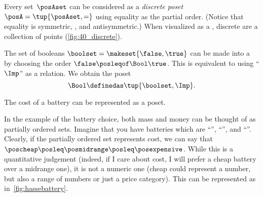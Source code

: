 \clearpage
\begin{marginfigure}
    \centering
    \caption{}
    \label{fig:40_discrete}
\end{marginfigure}

\begin{example}

    \label{ex:discreteposet}
    Every set~$\posAset$ can be considered as a \emph{discrete poset}~$\posA = \tup{\posAset,{{=}}}$ using equality as the partial order.
    (Notice that equality is symmetric, , and antisymmetric.)
    When visualized as a , discrete  are a collection of points (\cref{fig:40_discrete}).
\end{example}
\vspace{1cm}
\begin{marginfigure}[4mm]
    \centering
    \caption{}
\end{marginfigure}

\begin{definition}
    \label{def:bool-poset}
    The set of booleans $\boolset = \makeset{\false, \true}$ can be made into a  by choosing the order $\false \posleqof\Bool \true$.
    This is equivalent to using ``$\Imp$'' as a relation.
    We obtain the poset
    \begin{equation}
        \label{eq:bool-poset}
        \Bool \definedas \tup{\boolset, {{\Imp}}}.
    \end{equation}
\end{definition}

\vspace{1cm}
\begin{marginfigure}[4mm]
    \centering
    \caption{The cost of a battery can be represented as a poset.
    }
    \label{fig:hassebattery}
\end{marginfigure}
%
\begin{example}
    In the example of the battery choice, both mass and money can be thought of as partially ordered sets.
    Imagine that you have batteries which are ``\poscheap'', ``\posmidrange'', and ``\posexpensive''.
    Clearly, if the partially ordered set represents cost, we can say that~$\poscheap \posleq\posmidrange \posleq\posexpensive$.
    While this is a quantitative judgement (indeed, if I care about cost, I will prefer a cheap battery over a midrange one), it is not a numeric one (cheap could represent a number, but also a range of numbers or just a price category).
    This can be represented as in~\cref{fig:hassebattery}.
\end{example}

